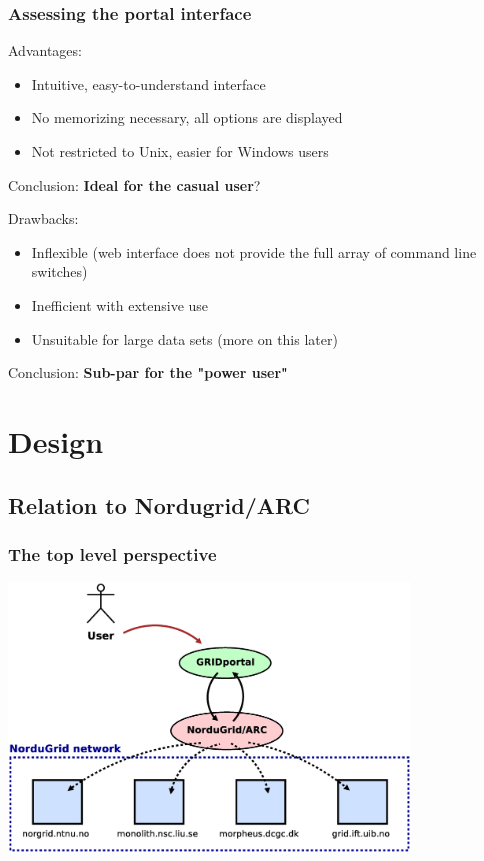 \documentclass{beamer}
\begin{document}
\begin{frame}
  \frametitle{Assessing the portal interface}

	Advantages:
  \begin{itemize}
  	\item Intuitive, easy-to-understand interface
	  \item No memorizing necessary, all options are displayed
	  \item Not restricted to Unix, easier for Windows users
  \end{itemize}
  Conclusion: {\bf Ideal for the casual user}?
	\bigskip
	
  Drawbacks:
  \begin{itemize}
  	\item Inflexible (web interface does not provide the full array of command line switches)
	  \item Inefficient with extensive use
	  \item Unsuitable for large data sets (more on this later)
  \end{itemize}
  Conclusion: {\bf Sub-par for the "power user"}
\end{frame}






\section{Design}







\subsection{Relation to Nordugrid/ARC}


\begin{frame}
  \frametitle{The top level perspective}

	\begin{center}
		\includegraphics[width=0.8\textwidth]{nordugrid.eps}
	\end{center}	
\end{frame}
\end{document}
